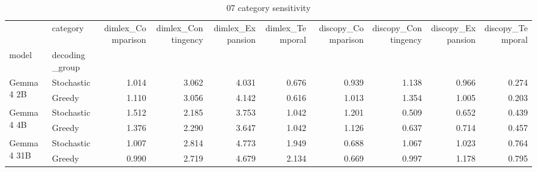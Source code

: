 \begin{table}
\caption{07 category sensitivity}
\begin{tabular}{llrrrrrrrr}
\toprule
 & category & dimlex\_Comparison & dimlex\_Contingency & dimlex\_Expansion & dimlex\_Temporal & discopy\_Comparison & discopy\_Contingency & discopy\_Expansion & discopy\_Temporal \\
model & decoding_group &  &  &  &  &  &  &  &  \\
\midrule
\multirow[t]{2}{*}{Gemma 4 2B} & Stochastic & 1.014 & 3.062 & 4.031 & 0.676 & 0.939 & 1.138 & 0.966 & 0.274 \\
 & Greedy & 1.110 & 3.056 & 4.142 & 0.616 & 1.013 & 1.354 & 1.005 & 0.203 \\
\cline{1-10}
\multirow[t]{2}{*}{Gemma 4 4B} & Stochastic & 1.512 & 2.185 & 3.753 & 1.042 & 1.201 & 0.509 & 0.652 & 0.439 \\
 & Greedy & 1.376 & 2.290 & 3.647 & 1.042 & 1.126 & 0.637 & 0.714 & 0.457 \\
\cline{1-10}
\multirow[t]{2}{*}{Gemma 4 31B} & Stochastic & 1.007 & 2.814 & 4.773 & 1.949 & 0.688 & 1.067 & 1.023 & 0.764 \\
 & Greedy & 0.990 & 2.719 & 4.679 & 2.134 & 0.669 & 0.997 & 1.178 & 0.795 \\
\cline{1-10}
\bottomrule
\end{tabular}
\end{table}
